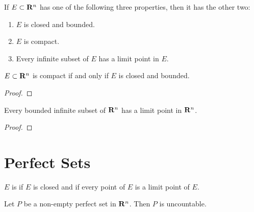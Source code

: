\begin{proposition}
If $E\subset\mathbf R^n$ has one of the following three properties, then it has the other two:
\begin{enumerate}[label=(\roman*)]
\item $E$ is closed and bounded.
\item $E$ is compact.
\item Every infinite subset of $E$ has a limit point in $E$.
\end{enumerate}
\end{proposition}

\begin{theorem}\label{thrm:heine-borel}
$E\subset\mathbf R^n$ is compact if and only if $E$ is closed and bounded.
\end{theorem}

\begin{proof}

\end{proof}

\begin{theorem}\label{thrm:bolzano-weierstrass}
Every bounded infinite subset of $\mathbf R^n$ has a limit point in $\mathbf R^n$.
\end{theorem}

\begin{proof}

\end{proof}

\begin{comment}
sequential compactness
A set $K$ is compact if and only if every sequence of points in $K$ has a subsequence that converges to a point in $K$.

Any continuous function defined on a compact set is bounded.

extreme value theorem
\end{comment}
\pagebreak

\section{Perfect Sets}
\begin{definition}
$E$ is  if $E$ is closed and if every point of $E$ is a limit point of $E$.
\end{definition}

\begin{proposition}
Let $P$ be a non-empty perfect set in $\mathbf R^n$. Then $P$ is uncountable.
\end{proposition}

